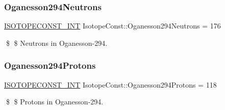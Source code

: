\subsubsection{\texorpdfstring{Oganesson294\+Neutrons}{Oganesson294Neutrons}}
{\footnotesize\ttfamily \mbox{\hyperlink{group___isotope_const-_macros_ga5f18360b3e99483a35c32d789e62621c}{I\+S\+O\+T\+O\+P\+E\+C\+O\+N\+S\+T\+\_\+\+I\+NT}} Isotope\+Const\+::\+Oganesson294\+Neutrons = 176}

\$ \$ Neutrons in Oganesson-\/294. \mbox{\label{group___isotope_const-_oganesson-_og294_gaac6e3d391c83c20225a5ab80f8a4b6e0}} 
\subsubsection{\texorpdfstring{Oganesson294\+Protons}{Oganesson294Protons}}
{\footnotesize\ttfamily \mbox{\hyperlink{group___isotope_const-_macros_ga5f18360b3e99483a35c32d789e62621c}{I\+S\+O\+T\+O\+P\+E\+C\+O\+N\+S\+T\+\_\+\+I\+NT}} Isotope\+Const\+::\+Oganesson294\+Protons = 118}

\$ \$ Protons in Oganesson-\/294. 